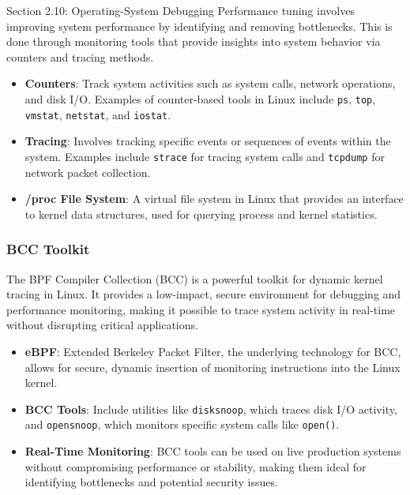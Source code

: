 \begin{notes}{Section 2.10: Operating-System Debugging}
    Performance tuning involves improving system performance by identifying and removing bottlenecks. This is done through monitoring tools that provide insights into system behavior via counters and tracing methods.
    
    \begin{highlight}
    
    \begin{itemize}
        \item \textbf{Counters}: Track system activities such as system calls, network operations, and disk I/O. Examples of counter-based tools in Linux include \texttt{ps}, \texttt{top}, \texttt{vmstat}, \texttt{netstat}, and \texttt{iostat}.
        \item \textbf{Tracing}: Involves tracking specific events or sequences of events within the system. Examples include \texttt{strace} for tracing system calls and \texttt{tcpdump} for network packet collection.
        \item \textbf{/proc File System}: A virtual file system in Linux that provides an interface to kernel data structures, used for querying process and kernel statistics.
    \end{itemize}
    
    \end{highlight}
    
    \subsubsection*{BCC Toolkit}
    
    The BPF Compiler Collection (BCC) is a powerful toolkit for dynamic kernel tracing in Linux. It provides a low-impact, secure environment for debugging and performance monitoring, making it possible 
    to trace system activity in real-time without disrupting critical applications.
    
    \begin{highlight}
    
    \begin{itemize}
        \item \textbf{eBPF}: Extended Berkeley Packet Filter, the underlying technology for BCC, allows for secure, dynamic insertion of monitoring instructions into the Linux kernel.
        \item \textbf{BCC Tools}: Include utilities like \texttt{disksnoop}, which traces disk I/O activity, and \texttt{opensnoop}, which monitors specific system calls like \texttt{open()}.
        \item \textbf{Real-Time Monitoring}: BCC tools can be used on live production systems without compromising performance or stability, making them ideal for identifying bottlenecks and potential security issues.
    \end{itemize}
    

\end{highlight}
\end{notes}
